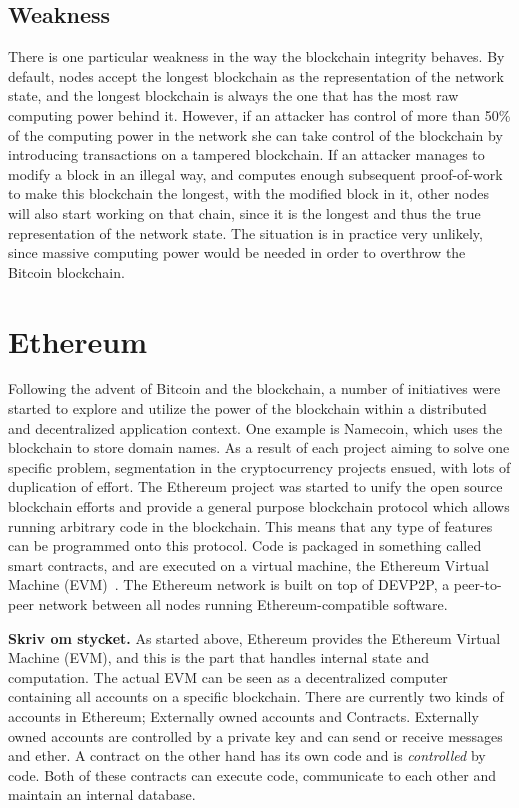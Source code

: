 \subsection{Weakness}
There is one particular weakness in the way the blockchain integrity behaves. By default, nodes accept the longest blockchain as the representation of the network state, and the longest blockchain is always the one that has the most raw computing power behind it. However, if an attacker has control of more than 50\% of the computing power in the network she can take control of the blockchain by introducing transactions on a tampered blockchain. If an attacker manages to modify a block in an illegal way, and computes enough subsequent proof-of-work to make this blockchain the longest, with the modified block in it, other nodes will also start working on that chain, since it is the longest and thus the true representation of the network state. The situation is in practice very unlikely, since massive computing power would be needed in order to overthrow the Bitcoin blockchain.

\section{Ethereum}
Following the advent of Bitcoin and the blockchain, a number of initiatives were started to explore and utilize the power of the blockchain within a distributed and decentralized application context. One example is Namecoin, which uses the blockchain to store domain names. As a result of each project aiming to solve one specific problem, segmentation in the cryptocurrency projects ensued, with lots of duplication of effort. The Ethereum project was started to unify the open source blockchain efforts and provide a general purpose blockchain protocol which allows running arbitrary code in the blockchain. This means that any type of features can be programmed onto this protocol. Code is packaged in something called smart contracts, and are executed on a virtual machine, the Ethereum Virtual Machine (EVM)~\cite{ethereum:white}. The Ethereum network is built on top of DEVP2P, a peer-to-peer network between all nodes running Ethereum-compatible software.

\textbf{Skriv om stycket.} As started above, Ethereum provides the Ethereum Virtual Machine (EVM), and this is the part that handles internal state and computation. The actual EVM can be seen as a decentralized computer containing all accounts on a specific blockchain. There are currently two kinds of accounts in Ethereum; Externally owned accounts and Contracts. Externally owned accounts are controlled by a private key and can send or receive messages and ether. A contract on the other hand has its own code and is \emph{controlled} by code. Both of these contracts can execute code, communicate to each other and maintain an internal database. 

